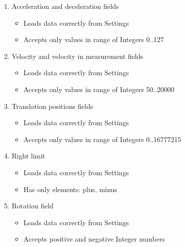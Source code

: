\begin{enumerate}
\item Acceleration and deceleration fields
\begin{itemize}
\item Loads data correctly from Settings
\item Accepts only values in range of Integers 0..127
\end{itemize}

\item Velocity and velocity in measurement fields
\begin{itemize}
\item Loads data correctly from Settings
\item Accepts only values in range of Integers 50..20000
\end{itemize}

\item Translation positions fields
\begin{itemize}
\item Loads data correctly from Settings
\item Accepts only values in range of Integers 0..16777215
\end{itemize}

\item Right limit
\begin{itemize}
\item Loads data correctly from Settings
\item Has only elements: plus, minus
\end{itemize}

\item Rotation field
\begin{itemize}
\item Loads data correctly from Settings
\item Accepts positive and negative Integer numbers
\end{itemize}

\end{enumerate}